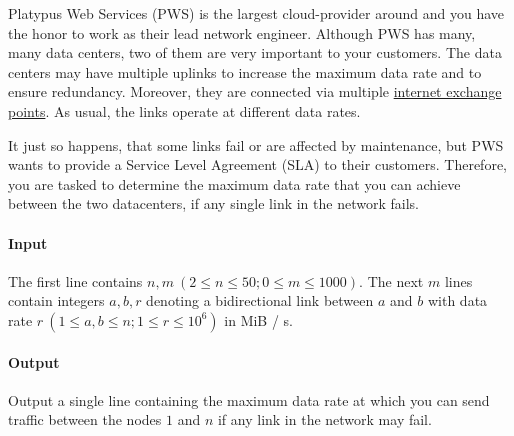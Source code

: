 



\makeheader

Platypus Web Services (PWS) is the largest cloud-provider around and you have the honor to work as their lead network engineer.
Although PWS has many, many data centers, two of them are very important to your customers.
The data centers may have multiple uplinks to increase the maximum data rate and to ensure redundancy.
Moreover, they are connected via multiple \href{https://en.wikipedia.org/wiki/Internet_exchange_point}{internet exchange points}.
As usual, the links operate at different data rates.

It just so happens, that some links fail or are affected by maintenance, but PWS wants to provide a Service Level Agreement (SLA) to their customers.
Therefore, you are tasked to determine the maximum data rate that you can achieve between the two datacenters, if any single link in the network fails.

\paragraph*{Input}

The first line contains $n, m ~ (2 \leq n \leq 50; 0 \leq m \leq 1000)$. The next $m$ lines
contain integers $a, b, r$ denoting a bidirectional link between $a$ and $b$ with data rate $r ~ (1 \leq a, b \leq n;
1 \leq r \leq 10^6)$ in MiB / s.

\paragraph*{Output}

Output a single line containing the maximum data rate at which you can send traffic between the nodes $1$ and $n$
if any link in the network may fail.

\begin{samples}
\end{samples}


